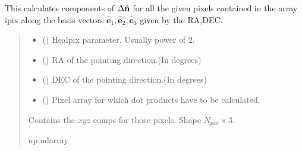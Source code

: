 \documentclass[a4paper,11pt,oneside,english,openany]{sphinxmanual}
\begin{document}
\begin{fulllineitems}
\label{\detokenize{simvis:simvis.dot_cal_superfast}}
\pysigstartsignatures
{}
\pysigstopsignatures
\sphinxAtStartPar
This calculates components of \(\Delta\hat{\bf n}\) for all the given pixels contained in the array ipix along the basis vectors \(\hat{\mathbf{e}}_1,\hat{\mathbf{e}}_2,\hat{\mathbf{e}}_3\) given by the RA,DEC.
\begin{quote}\begin{description}
\begin{itemize}
\item {} 
\sphinxAtStartPar
{} () \textendash{} Healpix parameter. Usually power of 2.

\item {} 
\sphinxAtStartPar
{} () \textendash{} RA of the pointing direction.(In degrees)

\item {} 
\sphinxAtStartPar
{} () \textendash{} DEC of the pointing direction.(In degrees)

\item {} 
\sphinxAtStartPar
{} () \textendash{} Pixel array for which dot products have to be calculated.

\end{itemize}

\sphinxAtStartPar
{} \textendash{} Contains the \(xyz\) comps for those pixels. Shape \(N_{pix} \times 3\).

\sphinxAtStartPar
np.ndarray

\end{description}\end{quote}

\end{fulllineitems}
\end{document}
